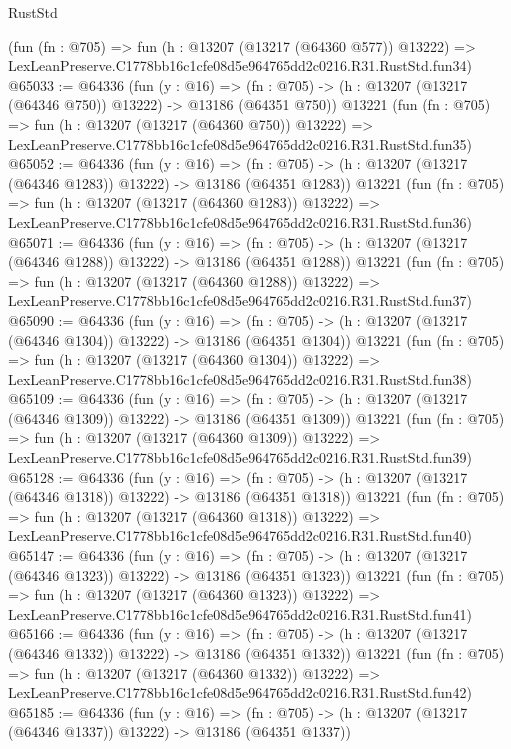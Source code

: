 \begin{lexlean}{RustStd}
\begin{coremodule}
    (fun (fn : @705) =>
    fun (h : @13207 (@13217 (@64360 @577)) @13222) =>
    LexLeanPreserve.C1778bb16c1cfe08d5e964765dd2c0216.R31.RustStd.fun34)
@65033 := @64336
    (fun (y : @16) =>
    (fn : @705) -> (h : @13207 (@13217 (@64346 @750)) @13222) -> @13186 (@64351 @750))
    @13221
    (fun (fn : @705) =>
    fun (h : @13207 (@13217 (@64360 @750)) @13222) =>
    LexLeanPreserve.C1778bb16c1cfe08d5e964765dd2c0216.R31.RustStd.fun35)
@65052 := @64336
    (fun (y : @16) =>
    (fn : @705) -> (h : @13207 (@13217 (@64346 @1283)) @13222) -> @13186 (@64351 @1283))
    @13221
    (fun (fn : @705) =>
    fun (h : @13207 (@13217 (@64360 @1283)) @13222) =>
    LexLeanPreserve.C1778bb16c1cfe08d5e964765dd2c0216.R31.RustStd.fun36)
@65071 := @64336
    (fun (y : @16) =>
    (fn : @705) -> (h : @13207 (@13217 (@64346 @1288)) @13222) -> @13186 (@64351 @1288))
    @13221
    (fun (fn : @705) =>
    fun (h : @13207 (@13217 (@64360 @1288)) @13222) =>
    LexLeanPreserve.C1778bb16c1cfe08d5e964765dd2c0216.R31.RustStd.fun37)
@65090 := @64336
    (fun (y : @16) =>
    (fn : @705) -> (h : @13207 (@13217 (@64346 @1304)) @13222) -> @13186 (@64351 @1304))
    @13221
    (fun (fn : @705) =>
    fun (h : @13207 (@13217 (@64360 @1304)) @13222) =>
    LexLeanPreserve.C1778bb16c1cfe08d5e964765dd2c0216.R31.RustStd.fun38)
@65109 := @64336
    (fun (y : @16) =>
    (fn : @705) -> (h : @13207 (@13217 (@64346 @1309)) @13222) -> @13186 (@64351 @1309))
    @13221
    (fun (fn : @705) =>
    fun (h : @13207 (@13217 (@64360 @1309)) @13222) =>
    LexLeanPreserve.C1778bb16c1cfe08d5e964765dd2c0216.R31.RustStd.fun39)
@65128 := @64336
    (fun (y : @16) =>
    (fn : @705) -> (h : @13207 (@13217 (@64346 @1318)) @13222) -> @13186 (@64351 @1318))
    @13221
    (fun (fn : @705) =>
    fun (h : @13207 (@13217 (@64360 @1318)) @13222) =>
    LexLeanPreserve.C1778bb16c1cfe08d5e964765dd2c0216.R31.RustStd.fun40)
@65147 := @64336
    (fun (y : @16) =>
    (fn : @705) -> (h : @13207 (@13217 (@64346 @1323)) @13222) -> @13186 (@64351 @1323))
    @13221
    (fun (fn : @705) =>
    fun (h : @13207 (@13217 (@64360 @1323)) @13222) =>
    LexLeanPreserve.C1778bb16c1cfe08d5e964765dd2c0216.R31.RustStd.fun41)
@65166 := @64336
    (fun (y : @16) =>
    (fn : @705) -> (h : @13207 (@13217 (@64346 @1332)) @13222) -> @13186 (@64351 @1332))
    @13221
    (fun (fn : @705) =>
    fun (h : @13207 (@13217 (@64360 @1332)) @13222) =>
    LexLeanPreserve.C1778bb16c1cfe08d5e964765dd2c0216.R31.RustStd.fun42)
@65185 := @64336
    (fun (y : @16) =>
    (fn : @705) -> (h : @13207 (@13217 (@64346 @1337)) @13222) -> @13186 (@64351 @1337))

\end{coremodule}
\end{lexlean}
